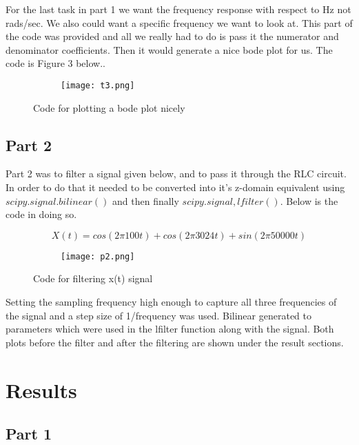 \documentclass[12pt,a4paper]{article}
\begin{document}
\noindent For the last task in part 1 we want the frequency response with respect to Hz not rads/sec. We also could want a specific frequency we want to look at. This part of the code was provided and all we really had to do is pass it the numerator and denominator coefficients. Then it would generate a nice bode plot for us. The code is Figure 3 below..

\begin{figure}[h]
\begin{subfigure}{ 1\textwidth}
\texttt{[image: t3.png]}
\end{subfigure}
\caption{Code for plotting a bode plot nicely}
\label{fig:image2}
\end{figure}


\subsection{Part 2}
Part 2 was to filter a signal given below, and to pass it through the RLC circuit. In order to do that it needed to be converted into it's z-domain equivalent using $scipy.signal.bilinear()$ and then finally $scipy.signal,lfilter()$. Below is the code in doing so.

\[X(t) = {cos(2\pi100t) + cos(2\pi3024t) + sin(2\pi50000t) } \]

\begin{figure}[h]
\begin{subfigure}{ 1\textwidth}
\texttt{[image: p2.png]}
\end{subfigure}
\caption{Code for filtering x(t) signal}
\label{fig:image2}
\end{figure}
Setting the sampling frequency high enough to capture all three frequencies of the signal and a step size of 1/frequency was used. Bilinear generated to parameters which were used in the lfilter function along with the signal. Both plots before the filter and after the filtering are shown under the result sections.

\clearpage







\clearpage

\section{Results}\label{sec:res}

\subsection{Part 1}
\end{document}
